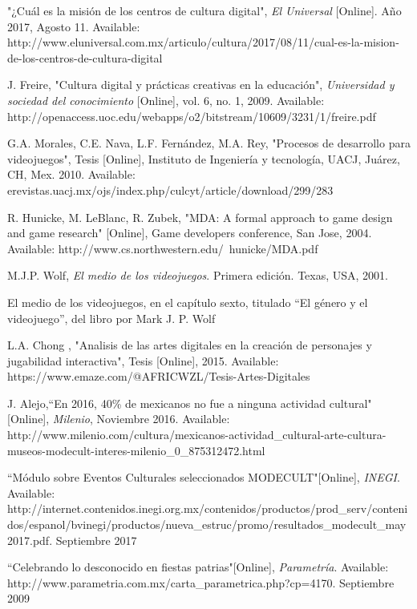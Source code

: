 \begin{thebibliography}{X}
	\textnormal "¿Cuál es la misión de los centros de cultura digital", \textit{El Universal} [Online]. Año 2017, Agosto 11. Available: http://www.eluniversal.com.mx/articulo/cultura/2017/08/11/cual-es-la-mision-de-los-centros-de-cultura-digital
	
	\textnormal J. Freire, "Cultura digital y prácticas creativas en la educación", \textit{Universidad y sociedad del conocimiento} [Online], vol. 6, no. 1, 2009. Available: http://openaccess.uoc.edu/webapps/o2/bitstream/10609/3231/1/freire.pdf
	
	\textnormal G.A. Morales, C.E. Nava, L.F. Fernández, M.A. Rey, "Procesos de desarrollo para videojuegos", Tesis [Online], Instituto de Ingeniería y tecnología, UACJ, Juárez, CH, Mex. 2010. Available: erevistas.uacj.mx/ojs/index.php/culcyt/article/download/299/283
	
	\textnormal R. Hunicke, M. LeBlanc, R. Zubek, "MDA: A formal approach to game design and game research" [Online], Game developers conference, San Jose, 2004. Available: http://www.cs.northwestern.edu/~hunicke/MDA.pdf

	\textnormal M.J.P. Wolf, \textit{El medio de los videojuegos}. Primera edición. Texas, USA, 2001.
	
	{El medio de los videojuegos}, en el capítulo sexto, titulado “El género y el videojuego”, del libro por Mark J. P. Wolf
	
	\textnormal L.A. Chong , "Analisis de las artes digitales en la creación de personajes y jugabilidad interactiva", Tesis [Online], 2015. Available: https://www.emaze.com/@AFRICWZL/Tesis-Artes-Digitales
	
	\textnormal{ J. Alejo,``En 2016, 40\% de mexicanos no fue a ninguna actividad cultural"[Online], \textit{Milenio}, Noviembre 2016. Available: http://www.milenio.com/cultura/mexicanos-actividad\_cultural-arte-cultura-museos-modecult-interes-milenio\_0\_875312472.html}

	\textnormal{ ``Módulo sobre Eventos Culturales seleccionados MODECULT"[Online], \textit{INEGI}. Available: http://internet.contenidos.inegi.org.mx/contenidos/productos/prod\_serv/contenidos/espanol/bvinegi/productos/nueva\_estruc/promo/resultados\_modecult\_may2017.pdf. Septiembre 2017}

	 ``Celebrando lo desconocido en fiestas patrias"[Online], \textit{Parametría}. Available: http://www.parametria.com.mx/carta\_parametrica.php?cp=4170. Septiembre 2009 


\end{thebibliography}
